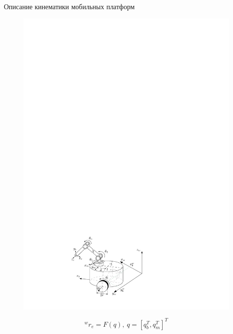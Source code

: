 \documentclass[newPxFont,numfooter,sectionpages]{beamer}
\begin{document}
\begin{frame}{Описание кинематики мобильных платформ}
\ \\

	\begin{minipage}{0.42\textwidth}
	\begin{flushleft} 
	\begin{figure}[H]
		\center
		\renewcommand{\figurename}{}
		\includegraphics[width=1.3\linewidth]{pic/MM3.pdf}
		\label{fig:scr1}
	\end{figure}		
	\end{flushleft} 
	\end{minipage}
		\begin{minipage}{0.56\textwidth}
			\begin{equation}
				{^wr_e} = F(q),\ q = [q_b^T,q_m^T]^T

\end{equation}
\end{minipage}
\end{frame}
\end{document}
